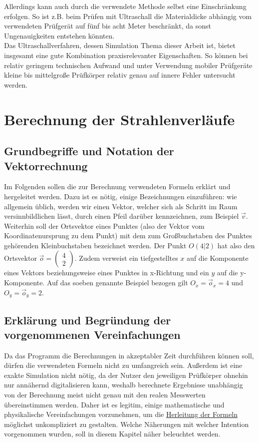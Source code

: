 \documentclass[reducespace,stylepage,semiarbeit]{spezidoc}
\newcommand{\vect}[2]{\begin{pmatrix}#1\\#2\end{pmatrix}}
\begin{document}
Allerdings kann auch durch die verwendete Methode selbst eine Einschränkung erfolgen. So ist z.B. beim Prüfen mit Ultraschall die Materialdicke abhängig vom verwendeten Prüfgerät auf fünf bis acht Meter beschränkt, da sonst Ungenauigkeiten entstehen könnten.\\
Das Ultraschallverfahren, dessen Simulation Thema dieser Arbeit ist, bietet insgesamt eine gute Kombination praxisrelevanter
 Eigenschaften. So können bei relativ geringem technischen Aufwand und unter Verwendung mobiler Prüfgeräte kleine bis mittelgroße Prüfkörper relativ genau auf innere Fehler untersucht werden.

\newpage

\section{Berechnung der Strahlenverläufe}

\subsection{Grundbegriffe und Notation der Vektorrechnung}
Im Folgenden sollen die zur Berechnung verwendeten Formeln erklärt und hergeleitet werden. 
Dazu ist es nötig, einige Bezeichnungen einzuführen: wie allgemein üblich, werden wir einen Vektor, welcher sich als \glqq Schritt\grqq{} im Raum versinnbildlichen lässt, durch einen Pfeil darüber kennzeichnen, zum Beispiel $\vec{v}$. 
Weiterhin soll der Ortsvektor eines Punktes (also der Vektor vom Koordinatenursprung zu dem Punkt) mit dem zum Großbuchstaben des Punktes gehörenden Kleinbuchstaben bezeichnet werden. Der Punkt $O(4|2)$ hat also den Ortsvektor $\vec{o} = \vect{4}{2}$. 
Zudem verweist ein tiefgestelltes $x$ auf die Komponente eines Vektors beziehungsweise eines Punktes in x-Richtung und ein $y$ auf die y-Komponente. 
Auf das soeben genannte Beispiel bezogen gilt $O_x = \vec{o}_x = 4$ und $O_y = \vec{o}_y = 2$.

\subsection{Erklärung und Begründung der vorgenommenen Vereinfachungen}
Da das Programm die Berechnungen in akzeptabler Zeit durchführen können soll, dürfen die verwendeten Formeln nicht zu umfangreich sein. 
Außerdem ist eine exakte Simulation nicht nötig, da der Nutzer den jeweiligen Prüfkörper ohnehin nur annähernd digitalisieren kann, weshalb berechnete Ergebnisse unabhängig von der Berechnung meist nicht genau mit den realen Messwerten übereinstimmen werden. 
Daher ist es legitim, einige mathematische und physikalische Vereinfachungen vorzunehmen, um die \hyperref[sec:herleitung]{Herleitung der Formeln} möglichst unkompliziert zu gestalten. 
Welche Näherungen mit welcher Intention vorgenommen wurden, soll in diesem Kapitel näher beleuchtet werden.
\end{document}
